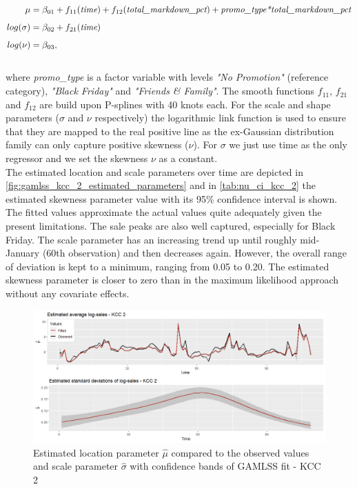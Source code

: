 \begin{equation}
\begin{aligned}
\mu &= \beta_{01} + f_{11}(\textit{time}) + f_{12}(\textit{total\_markdown\_pct}) + \textit{promo\_type*total\_markdown\_pct} \\ \noalign{\vskip5pt}
log(\sigma) &= \beta_{02} + f_{21}(\textit{time}) \\ \noalign{\vskip5pt}
log(\nu) &=  \beta_{03}, 
\end{aligned}
\label{eq:gamlss_kcc_2}
\end{equation} \\
where \textit{promo\_type} is a factor variable with levels \textit{"No Promotion"} (reference category), \textit{"Black Friday"} and \textit{"Friends \& Family"}. The smooth functions $f_{11}$, $f_{21}$ and $f_{12}$ are build upon P-splines with 40 knots each. For the scale and shape parameters ($\sigma$ and $\nu$ respectively) the logarithmic link function is used to ensure that they are mapped to the real positive line as the ex-Gaussian distribution family can only capture positive skewness ($\nu$). For $\sigma$ we just use time as the only regressor and we set the skewness $\nu$ as a constant.\\
 The estimated location and scale parameters over time are depicted in \autoref{fig:gamlss_kcc_2_estimated_parameters} and in \autoref{tab:nu_ci_kcc_2} the estimated skewness parameter value with its 95\% confidence interval is shown. The fitted values approximate the actual values quite adequately given the present limitations. The sale peaks are also well captured, especially for Black Friday. The scale parameter has an increasing trend up until roughly mid-January (60th observation) and then decreases again. However, the overall range of deviation is kept to a minimum, ranging from 0.05 to 0.20. The estimated skewness parameter is closer to zero than in the maximum likelihood approach without any covariate effects.
\\


\begin{figure}[H]
\centering
  \includegraphics[width=0.95\linewidth]{figures/gamlss_kcc_2_estimated_parameters.png}
  \caption{Estimated location parameter $\hat{\mu}$ compared to the observed values and scale parameter $\hat{\sigma}$ with confidence bands of GAMLSS fit - KCC 2}
  \label{fig:gamlss_kcc_2_estimated_parameters}
\end{figure}





